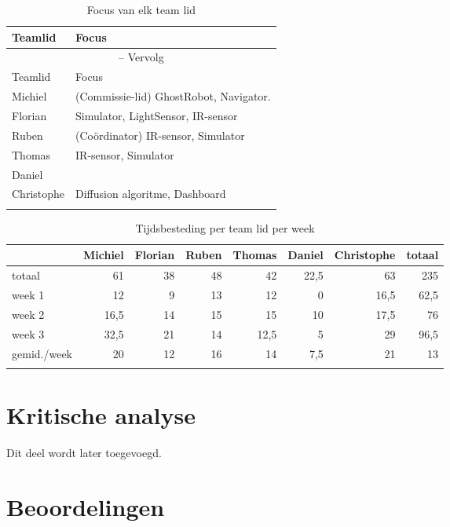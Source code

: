 \documentclass[12pt,a4paper]{report}
\begin{document}
\begin{longtable}{l l}
\caption{Focus van elk team lid} \\ [0.5ex]
\hline\hline
Teamlid & Focus \\ [0.5ex]
\hline 
\endfirsthead
\multicolumn{2}{c}{{\tablename} \thetable{} -- Vervolg} \\[0.5ex]
\hline \hline
Teamlid & Focus \\ [0.5ex]
\hline 
\endhead
Michiel 		& 	(Commissie-lid) GhostRobot, Navigator. \\
Florian 		&	Simulator, LightSensor, IR-sensor\\
Ruben 		&	(Co\"ordinator) IR-sensor, Simulator\\
Thomas 		&	IR-sensor, Simulator\\
Daniel 		&	\\
Christophe 	&	Diffusion algoritme, Dashboard \\
\hline
\label{tab:focus}
\end{longtable}

\begin{longtable}{l r r r r r r r}
\caption{Tijdsbesteding per team lid per week} \\
\hline\hline
 & Michiel & Florian & Ruben & Thomas & Daniel & Christophe & totaal \\
\hline 
\endfirsthead
totaal & 61 & 38 & 48 & 42 & 22,5 & 63 & 235\\
\hline
week 1 & 12 & 9 & 13 & 12 & 0 & 16,5 & 62,5 \\
week 2 & 16,5 & 14 & 15 & 15 & 10 & 17,5 & 76 \\
week 3 & 32,5 & 21 & 14 & 12,5 & 5 & 29 & 96,5 \\
\hline
gemid./week & 20 & 12 & 16 & 14 & 7,5 & 21 & 13 \\
\label{tab:tijdsregistratie}
\end{longtable}

\chapter{Kritische analyse}

Dit deel wordt later toegevoegd.

\appendix

\chapter{Beoordelingen}
\end{document}
